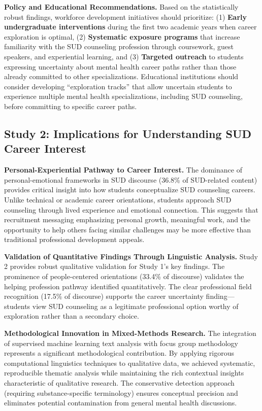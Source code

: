 \documentclass[
  man,
  longtable,
  nolmodern,
  notxfonts,
  notimes,
  colorlinks=true,linkcolor=blue,citecolor=blue,urlcolor=blue]{apa7}
\begin{document}
\textbf{Policy and Educational Recommendations.} Based on the
statistically robust findings, workforce development initiatives should
prioritize: (1) \textbf{Early undergraduate interventions} during the
first two academic years when career exploration is optimal, (2)
\textbf{Systematic exposure programs} that increase familiarity with the
SUD counseling profession through coursework, guest speakers, and
experiential learning, and (3) \textbf{Targeted outreach} to students
expressing uncertainty about mental health career paths rather than
those already committed to other specializations. Educational
institutions should consider developing ``exploration tracks'' that
allow uncertain students to experience multiple mental health
specializations, including SUD counseling, before committing to specific
career paths.

\subsection{Study 2: Implications for Understanding SUD Career
Interest}\label{study-2-implications-for-understanding-sud-career-interest}

\textbf{Personal-Experiential Pathway to Career Interest.} The dominance
of personal-emotional frameworks in SUD discourse (36.8\% of SUD-related
content) provides critical insight into how students conceptualize SUD
counseling careers. Unlike technical or academic career orientations,
students approach SUD counseling through lived experience and emotional
connection. This suggests that recruitment messaging emphasizing
personal growth, meaningful work, and the opportunity to help others
facing similar challenges may be more effective than traditional
professional development appeals.

\textbf{Validation of Quantitative Findings Through Linguistic
Analysis.} Study 2 provides robust qualitative validation for Study 1's
key findings. The prominence of people-centered orientations (33.4\% of
discourse) validates the helping profession pathway identified
quantitatively. The clear professional field recognition (17.5\% of
discourse) supports the career uncertainty finding---students view SUD
counseling as a legitimate professional option worthy of exploration
rather than a secondary choice.

\textbf{Methodological Innovation in Mixed-Methods Research.} The
integration of supervised machine learning text analysis with focus
group methodology represents a significant methodological contribution.
By applying rigorous computational linguistics techniques to qualitative
data, we achieved systematic, reproducible thematic analysis while
maintaining the rich contextual insights characteristic of qualitative
research. The conservative detection approach (requiring
substance-specific terminology) ensures conceptual precision and
eliminates potential contamination from general mental health
discussions.
\end{document}
